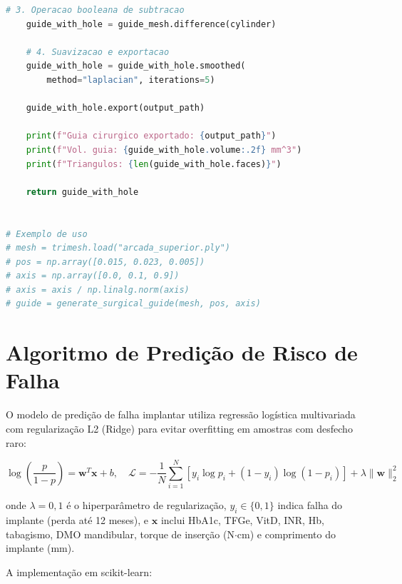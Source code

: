 \begin{lstlisting}[language=Python, caption=Geracao de guia cirurgico por operacao booleana com trimesh, label=code:guia-cirurgico]
    # 3. Operacao booleana de subtracao
    guide_with_hole = guide_mesh.difference(cylinder)

    # 4. Suavizacao e exportacao
    guide_with_hole = guide_with_hole.smoothed(
        method="laplacian", iterations=5)

    guide_with_hole.export(output_path)

    print(f"Guia cirurgico exportado: {output_path}")
    print(f"Vol. guia: {guide_with_hole.volume:.2f} mm^3")
    print(f"Triangulos: {len(guide_with_hole.faces)}")

    return guide_with_hole


# Exemplo de uso
# mesh = trimesh.load("arcada_superior.ply")
# pos = np.array([0.015, 0.023, 0.005])
# axis = np.array([0.0, 0.1, 0.9])
# axis = axis / np.linalg.norm(axis)
# guide = generate_surgical_guide(mesh, pos, axis)
\end{lstlisting}

\section{Algoritmo de Predição de Risco de Falha}
\label{sec:predicao-falha}

O modelo de predição de falha implantar utiliza regressão logística multivariada com regularização L2 (Ridge) para evitar overfitting em amostras com desfecho raro:

\begin{equation}
\label{eq:logit-implante}
\log\left(\frac{p}{1-p}\right) = \mathbf{w}^T \mathbf{x} + b, \quad \mathcal{L} = -\frac{1}{N}\sum_{i=1}^{N} \left[y_i \log p_i + (1-y_i)\log(1-p_i)\right] + \lambda \|\mathbf{w}\|_2^2
\end{equation}

onde $\lambda = 0,1$ é o hiperparâmetro de regularização, $y_i \in \{0,1\}$ indica falha do implante (perda até 12 meses), e $\mathbf{x}$ inclui HbA1c, TFGe, VitD, INR, Hb, tabagismo, DMO mandibular, torque de inserção (N$\cdot$cm) e comprimento do implante (mm).

A implementação em scikit-learn:


